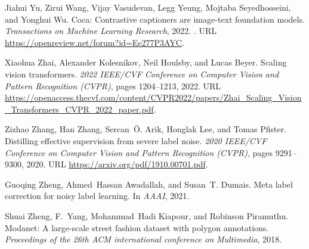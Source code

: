 \documentclass{bmvc2k}
\begin{document}
\begin{thebibliography}{63}
Jiahui Yu, Zirui Wang, Vijay Vasudevan, Legg Yeung, Mojtaba Seyedhosseini, and
  Yonghui Wu.
\newblock Coca: Contrastive captioners are image-text foundation models.
\newblock \emph{Transactions on Machine Learning Research}, 2022.
\newblock {}.
\newblock URL \url{https://openreview.net/forum?id=Ee277P3AYC}.

Xiaohua Zhai, Alexander Kolesnikov, Neil Houlsby, and Lucas Beyer.
\newblock Scaling vision transformers.
\newblock \emph{2022 IEEE/CVF Conference on Computer Vision and Pattern
  Recognition (CVPR)}, pages 1204--1213, 2022.
\newblock URL
  \url{https://openaccess.thecvf.com/content/CVPR2022/papers/Zhai_Scaling_Vision_Transformers_CVPR_2022_paper.pdf}.

Zizhao Zhang, Han Zhang, Sercan~{\"O}. Arik, Honglak Lee, and Tomas Pfister.
\newblock Distilling effective supervision from severe label noise.
\newblock \emph{2020 IEEE/CVF Conference on Computer Vision and Pattern
  Recognition (CVPR)}, pages 9291--9300, 2020.
\newblock URL \url{https://arxiv.org/pdf/1910.00701.pdf}.

Guoqing Zheng, Ahmed~Hassan Awadallah, and Susan~T. Dumais.
\newblock Meta label correction for noisy label learning.
\newblock In \emph{AAAI}, 2021.

Shuai Zheng, F.~Yang, Mohammad~Hadi Kiapour, and Robinson Piramuthu.
\newblock Modanet: A large-scale street fashion dataset with polygon
  annotations.
\newblock \emph{Proceedings of the 26th ACM international conference on
  Multimedia}, 2018.

\end{thebibliography}
 
\end{document}

